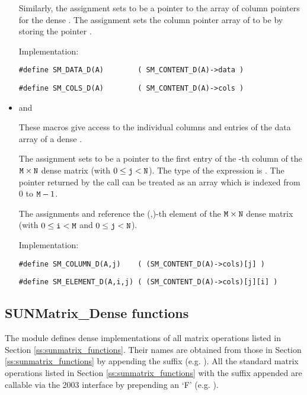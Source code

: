 \begin{itemize}
  Similarly, the assignment  sets  to be     
  a pointer to the array of column pointers for the dense  . 
  The assignment  sets the column pointer
  array of  to be  by storing the pointer .                   
  
  Implementation:

  \verb|#define SM_DATA_D(A)        ( SM_CONTENT_D(A)->data )|

  \verb|#define SM_COLS_D(A)        ( SM_CONTENT_D(A)->cols )|


\item {} and 
                                                            
  These macros give access to the individual columns and entries of
  the data array of a dense .

  The assignment  sets  to be
  a pointer to the first entry of the -th column of the ${\tt M} \times {\tt N}$
  dense matrix  (with $0 \le {\tt j} < {\tt N}$).  The type of the
  expression  is .  The pointer
  returned by the call  can be treated as  
  an array which is indexed from $0$ to ${\tt M}-1$.

  The assignments  and  reference the (,)-th element of the
  ${\tt M} \times {\tt N}$ dense matrix  (with $0 \le {\tt i} < {\tt M}$ and
  $0 \le {\tt j} < {\tt N}$).

  Implementation:

  \verb|#define SM_COLUMN_D(A,j)    ( (SM_CONTENT_D(A)->cols)[j] )|

  \verb|#define SM_ELEMENT_D(A,i,j) ( (SM_CONTENT_D(A)->cols)[j][i] )|

\end{itemize}


\subsection{SUNMatrix\_Dense functions}
\label{ss:sunmat_dense_functions}

The {\sunmatdense} module defines dense implementations of all matrix
operations listed in Section \ref{ss:sunmatrix_functions}. Their names are obtained
from those in Section \ref{ss:sunmatrix_functions} by appending the
suffix  (e.g. ). 
All the standard matrix operations listed in Section \ref{ss:sunmatrix_functions} with the suffix
 appended are callable via the {\F} 2003 interface by prepending an
`F' (e.g. ).

